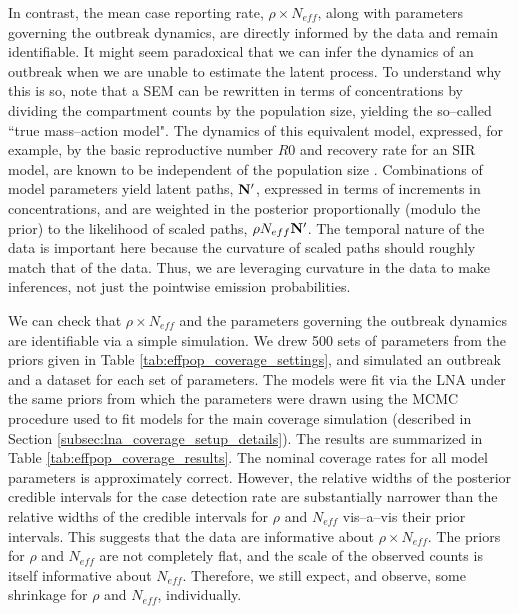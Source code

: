 In contrast, the mean case reporting rate, $ \rho\times N_{eff} $, along with parameters governing the outbreak dynamics, are directly informed by the data and remain identifiable. It might seem paradoxical that we can infer the dynamics of an outbreak when we are unable to estimate the latent process. To understand why this is so, note that a SEM can be rewritten in terms of concentrations by dividing the compartment counts by the population size, yielding the so--called ``true mass--action model". The dynamics of this equivalent model, expressed, for example, by the basic reproductive number $ R0 $ and recovery rate for an SIR model, are known to be independent of the population size \cite{dejong1995does}. Combinations of model parameters yield latent paths, $ \mathbf{N}^\prime $, expressed in terms of increments in concentrations, and are weighted in the posterior proportionally (modulo the prior) to the likelihood of scaled paths, $ \rho N_{eff}\mathbf{N}^\prime $. The temporal nature of the data is important here because the curvature of scaled paths should roughly match that of the data. Thus, we are leveraging curvature in the data to make inferences, not just the pointwise emission probabilities. 

We can check that $ \rho\times N_{eff} $ and the parameters governing the outbreak dynamics are identifiable via a simple simulation. We drew 500 sets of parameters from the priors given in Table \ref{tab:effpop_coverage_settings}, and simulated an outbreak and a dataset for each set of parameters. The models were fit via the LNA under the same priors from which the parameters were drawn using the MCMC procedure used to fit models for the main coverage simulation (described in Section \ref{subsec:lna_coverage_setup_details}). The results are summarized in Table \ref{tab:effpop_coverage_results}. The nominal coverage rates for all model parameters is approximately correct. However, the relative widths of the posterior credible intervals for the case detection rate are substantially narrower than the relative widths of the credible intervals for $ \rho $ and $ N_{eff} $ vis--a--vis their prior intervals. This suggests that the data are informative about $ \rho\times N_{eff} $. The priors for $ \rho $ and $ N_{eff} $ are not completely flat, and the scale of the observed counts is itself informative about $ N_{eff} $. Therefore, we still expect, and observe, some shrinkage for $ \rho $ and $ N_{eff} $, individually.

